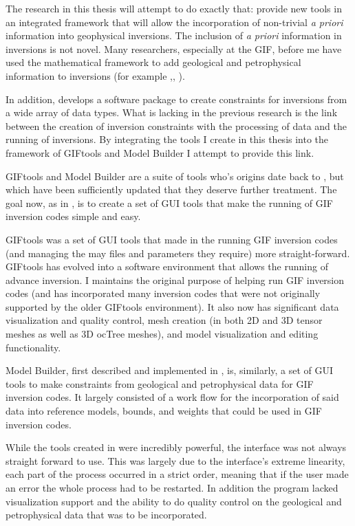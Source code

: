 The research in this thesis will attempt to do exactly that: provide new tools in an integrated framework that will allow the incorporation of non-trivial \emph{a priori} information into geophysical inversions. The inclusion of \emph{a priori} information in inversions is not novel. Many researchers, especially at the \ac{GIF}, before me have used the mathematical framework to add geological and petrophysical information to inversions (for example \citealt{Lelievre2009Integrating},\citealt{phillips2001thesis}, \citealt{farquharson2008geologically}). 

In addition, \cite{williams2008geologically} develops a software package to create constraints for inversions from a wide array of data types. What is lacking in the previous research is the link between the creation of inversion constraints with the processing of data and the running of inversions. By integrating the tools I create in this thesis into the framework of GIFtools and Model Builder I attempt to provide this link. 

GIFtools and Model Builder are a suite of tools who's origins date back to \cite{williams2008geologically}, but which have been sufficiently updated that they deserve further treatment. The goal now, as in \cite{williams2008geologically}, is to create a set of \ac{GUI} tools that make the running of \ac{GIF} inversion codes simple and easy. 

GIFtools was a set of \ac{GUI} tools that made in the running \ac{GIF} inversion codes (and managing the may files and parameters they require) more straight-forward. GIFtools has evolved into a software environment that allows the running of advance inversion. I maintains the original purpose of helping run \ac{GIF} inversion codes (and has incorporated many inversion codes that were not originally supported by the older GIFtools environment). It also now has significant data visualization and quality control, mesh creation (in both 2D and 3D tensor meshes as well as 3D ocTree meshes), and model visualization and editing functionality.

Model Builder, first described and implemented in \cite{williams2008geologically}, is, similarly, a set of \ac{GUI} tools to make constraints from geological and petrophysical data for \ac{GIF} inversion codes. It largely consisted of a work flow for the incorporation of said data into reference models, bounds, and weights that could be used in \ac{GIF} inversion codes. 

While the tools created in \cite{williams2008geologically} were incredibly powerful, the interface was not always straight forward to use. This was largely due to the interface's extreme linearity, each part of the process occurred in a strict order, meaning that if the user made an error the whole process had to be restarted. In addition the program lacked visualization support and the ability to do quality control on the geological and petrophysical data that was to be incorporated.

